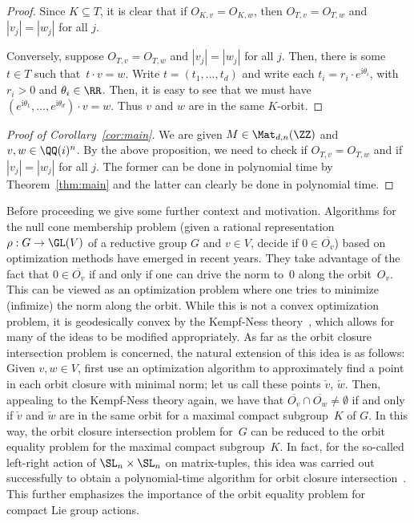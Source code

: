 \begin{proof}
Since $K \subseteq T$, it is clear that if $O_{K,v} = O_{K,w}$, then $O_{T,v} = O_{T,w}$ and $|v_j| = |w_j|$ for all $j$.

Conversely, suppose $O_{T,v} = O_{T,w}$ and $|v_j| = |w_j|$ for all $j$.
Then, there is some $t \in T$ such that~$t \cdot v = w$.
Write $t = (t_1,\dots,t_d)$ and write each $t_i = r_i \cdot e^{\mathrm i \theta_i}$, with $r_i > 0$ and $\theta_i \in \RR$.
Then, it is easy to see that we must have $(e^{\mathrm i \theta_1},\dots,e^{\mathrm i \theta_d}) \cdot v = w$.
Thus $v$ and $w$ are in the same $K$-orbit. 
\end{proof}

\begin{proof} [Proof of Corollary~\ref{cor:main}]
We are given $M \in \Mat_{d,n}(\ZZ)$ and $v,w \in \QQ(i)^n$.
%
By the above proposition, we need to check if $O_{T,v} = O_{T,w}$ and if $|v_j| = |w_j|$ for all $j$.
The former can be done in polynomial time by Theorem~\ref{thm:main} and the latter can clearly be done in polynomial time.
\end{proof}

Before proceeding we give some further context and motivation.
Algorithms for the null cone membership problem (given a rational representation $\rho:G \rightarrow \GL(V)$ of a reductive group $G$ and $v \in V$, decide if $0 \in \overline{O_v}$) based on optimization methods have emerged in recent years.
They take advantage of the fact that $0 \in \overline{O_v}$ if and only if one can drive the norm to~$0$ along the orbit~$O_v$.
This can be viewed as an optimization problem where one tries to minimize (infimize) the norm along the orbit.
While this is not a convex optimization problem, it is geodesically convex by the Kempf-Ness theory~\cite{KN:78}, which allows for many of the ideas to be modified appropriately.
As far as the orbit closure intersection problem is concerned, the natural extension of this idea is as follows:
Given $v,w \in V$, first use an optimization algorithm to approximately find a point in each orbit closure with minimal norm;
let us call these points $\check{v}$, $\check{w}$.
Then, appealing to the Kempf-Ness theory again, we have that $\overline{O_v} \cap \overline{O_w} \neq \emptyset$ if and only if $\check{v}$ and $\check{w}$ are in the same orbit for a maximal compact subgroup~$K$ of $G$.
In this way, the orbit closure intersection problem for~$G$ can be reduced to the orbit equality problem for the maximal compact subgroup~$K$.
In fact, for the so-called left-right action of $\SL_n \times \SL_n$ on matrix-tuples, this idea was carried out successfully to obtain a polynomial-time algorithm for orbit closure intersection~\cite{AZGLOW}.
This further emphasizes the importance of the orbit equality problem for compact Lie group actions.

